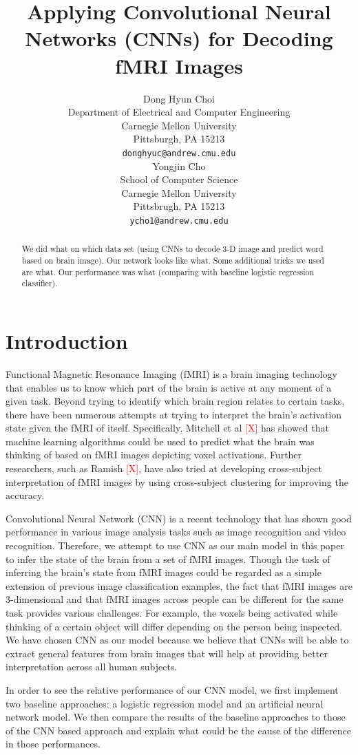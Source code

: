 \documentclass{article} %
\title{Applying Convolutional Neural Networks (CNNs) for Decoding fMRI Images}
\author{
Dong Hyun Choi \\
Department of Electrical and Computer Engineering\\
Carnegie Mellon University\\
Pittsburgh, PA 15213 \\
\texttt{donghyuc@andrew.cmu.edu} \\
\And
Yongjin Cho \\
School of Computer Science \\
Carnegie Mellon University \\
Pittsbrugh, PA 15213\\
\texttt{ycho1@andrew.cmu.edu} \\
}
\begin{document}
\maketitle

\begin{abstract}
We did what on which data set (using CNNs to decode 3-D image and predict word based on brain image). Our network looks like what. Some additional tricks we used are what. Our performance was what (comparing with baseline logistic regression classifier).
\end{abstract}

\section{Introduction}

Functional Magnetic Resonance Imaging (fMRI) is a brain imaging technology that enables us to know which part of the brain is active at any moment of a given task. Beyond trying to identify which brain region relates to certain tasks, there have been numerous attempts at trying to interpret the brain's activation state given the fMRI of itself. Specifically, Mitchell et al \textcolor{red}{[X]} has showed that machine learning algorithms could be used to predict what the brain was thinking of based on fMRI images depicting voxel activations. Further researchers, such as Ramish \textcolor{red}{[X]}, have also tried at developing cross-subject interpretation of fMRI images by using cross-subject clustering for improving the accuracy.

Convolutional Neural Network (CNN) is a recent technology that has shown good performance in various image analysis tasks such as image recognition and video recognition. Therefore, we attempt to use CNN as our main model in this paper to infer the state of the brain from a set of fMRI images. Though the task of inferring the brain's state from fMRI images could be regarded as a simple extension of previous image classification examples, the fact that fMRI images are 3-dimensional and that fMRI images across people can be different for the same task provides various challenges. For example, the voxels being activated while thinking of a certain object will differ depending on the person being inspected. We have chosen CNN as our model because we believe that CNNs will be able to extract general features from brain images that will help at providing better interpretation across all human subjects.

In order to see the relative performance of our CNN model, we first implement two baseline approaches: a logistic regression model and an artificial neural network model. We then compare the results of the baseline approaches to those of the CNN based approach and explain what could be the cause of the difference in those performances. 
\end{document}
